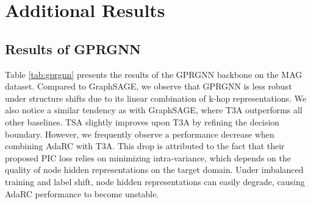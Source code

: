 \section{Additional Results}



\subsection{Results of GPRGNN}
Table \ref{tab:gprgnn} presents the results of the GPRGNN backbone on the MAG dataset. 
Compared to GraphSAGE, we observe that GPRGNN is less robust under structure shifts due to its linear combination of k-hop representations.
We also notice a similar tendency as with GraphSAGE, where T3A outperforms all other baselines. 
TSA slightly improves upon T3A by refining the decision boundary. 
However, we frequently observe a performance decrease when combining AdaRC with T3A. 
This drop is attributed to the fact that their proposed PIC loss relies on minimizing intra-variance, which depends on the quality of node hidden representations on the target domain. 
Under imbalanced training and label shift, node hidden representations can easily degrade, causing AdaRC performance to become unstable.

